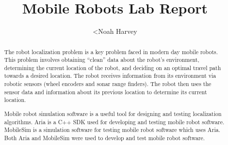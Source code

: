 \documentclass[a4paper,titlepage]{article}
\begin{document}
	\title{Mobile Robots Lab Report}
	\author{<Noah Harvey}
	\maketitle

	\begin{abstract}

	The robot localization problem is a key problem faced in modern day mobile
	robots. This problem involves obtaining ``clean'' data about the robot's
	environment, determining the current location of the robot, and deciding on an
	optimal travel path towards a desired location. The robot receives information
	from its environment via robotic sensors (wheel encoders and sonar range
	finders). The robot then uses the sensor data and information about its
	previous location to determine its current location.

	Mobile robot simulation software is a useful tool for designing and testing
	localization algorithms. Aria is a C++ SDK used for developing and
	testing mobile robot software. MobileSim is a simulation software
	for testing mobile robot software which uses Aria. Both Aria and MobileSim
	were used to develop and test mobile robot software.
	
	\end{abstract}

	\tableofcontents
	\listoftables
	\listoffigures

	
	
	
	
\end{document}
